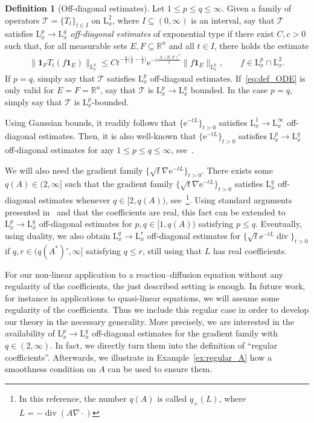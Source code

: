 \documentclass[11pt, leqno]{amsart}
\theoremstyle{definition}
\newtheorem{definition}[theorem]{Definition}
\newcommand{\R}{\mathbb{R}}
\renewcommand{\L}{\mathrm{L}}
\newcommand{\e}{\mathrm{e}}
\newcommand{\ind}{\mathbf{1}}
\DeclareMathOperator{\dist}{d}
\DeclareMathOperator{\Div}{div}
\begin{document}
	\begin{definition}[Off-diagonal estimates]
		Let $1\leq p \leq q \leq \infty$. Given a family of operators $\mathcal{T} = \{ T_t \}_{t \in I}$ on $\L^2_x$, where $I \subseteq (0,\infty)$ is an interval, say that $\mathcal{T}$ satisfies $\L^p_x \to \L^q_x$ \emph{off-diagonal estimates} of exponential type if there exist $C,c > 0$ such that,
		for all measurable sets $E,F \subseteq \R^n$ and all $t\in I$, there holds the estimate
		\begin{align}
			\label{eq:def_ODE}
			\| \ind_F T_t (f\ind_E) \|_{\L^q_x} \leq C t^{-\frac{n}{2}\bigl( \frac{1}{p} - \frac{1}{q} \bigr)} \e^{-c\frac{\dist(E,F)^2}{t}} \| f \ind_E \|_{\L^p_x}, \qquad f \in \L^p_x \cap \L^2_x.
		\end{align}
		If $p=q$, simply say that $\mathcal{T}$ satisfies $\L^p_x$ off-diagonal estimates. If~\eqref{eq:def_ODE} is only valid for $E = F = \R^n$, say that $\mathcal{T}$ is $\L^p_x \to \L^q_x$ bounded. In the case $p=q$, simply say that $\mathcal{T}$ is $\L^p_x$-bounded.
	\end{definition}
	Using Gaussian bounds, it readily follows that $\{ \e^{-tL} \}_{t>0}$ satisfies $\L^1_x \to \L^\infty_x$ off-diagonal estimates. Then, it is also well-known that $\{ \e^{-tL} \}_{t>0}$ satisfies $\L^p_x \to \L^q_x$ off-diagonal estimates for any $1 \leq p \leq q \leq \infty$, see~\cite{Memoirs}.

	We will also need the gradient family $\{ \sqrt{t} \nabla \e^{-tL} \}_{t>0}$. {There exists some $q(A) \in (2,\infty]$ such that the gradient family $\{ \sqrt{t} \nabla \e^{-tL} \}_{t>0}$ satisfies $\L^q_x$ off-diagonal estimates whenever $q \in [2, q(A))$, see~\cite[Prop.~2.1 \& Cor.~3.10]{Memoirs}\footnote{In this reference, the number $q(A)$ is called $q_{+}(L)$, where $L = -\Div(A\nabla \cdot)$}.}
	Using standard arguments presented in~\cite{Memoirs} and that the coefficients are real, this fact can be extended to $\L^p_x \to \L^q_x$ off-diagonal estimates for $p,q \in [1,q(A))$ satisfying $p \leq q$.
	{Eventually, using duality, we also obtain $\L^q_x \to \L^r_x$ off-diagonal estimates for $\{ \sqrt{t} \e^{-tL} \Div \}_{t>0}$ if $q,r \in (q(A^*)', \infty]$ satisfying $q \leq r$, still using that $L$ has real coefficients.}

	For our non-linear application to a reaction--diffusion equation without any regularity of the coefficients, the just described setting is enough. In future work, for instance in applications to quasi-linear equations, we will assume some regularity of the coefficients. Thus we include this regular case in order to develop our theory in the necessary generality.
	More precisely, we are interested in the availability of $\L^p_x \to \L^q_x$ off-diagonal estimates for the gradient family with $q \in (2,\infty)$. In fact, we directly turn them into the definition of \enquote{regular coefficients}. Afterwards, we illustrate in Example~\ref{ex:regular_A} how a smoothness condition on $A$ can be used to ensure them.
\end{document}
